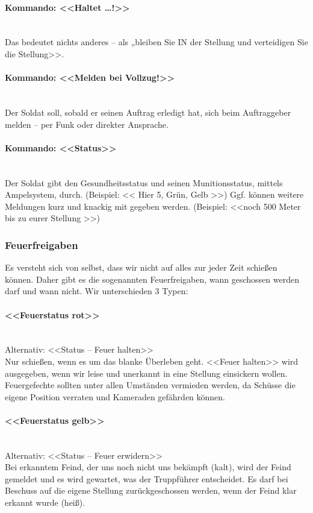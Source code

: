 \paragraph*{Kommando: <<Haltet \dots!>>}\ \\
	Das bedeutet nichts anderes – als „bleiben Sie IN der Stellung und verteidigen Sie die Stellung>>.

\paragraph*{Kommando: <<Melden bei Vollzug!>>}\ \\
	Der Soldat soll, sobald er seinen Auftrag erledigt hat, sich beim Auftraggeber melden – per Funk oder direkter Ansprache.

\paragraph*{Kommando: <<Status>>}\ \\
	Der Soldat gibt den Gesundheitsstatus und seinen Munitionsstatus, mittels Ampelsystem, durch. (Beispiel: << Hier 5, Grün, Gelb >>) Ggf. können weitere Meldungen kurz und knackig mit gegeben werden. (Beispiel: <<noch 500 Meter bis zu eurer Stellung >>)

\subsubsection{Feuerfreigaben}
	Es versteht sich von selbst, dass wir nicht auf alles zur jeder Zeit schießen können. Daher gibt es die sogenannten Feuerfreigaben, wann geschossen werden darf und wann nicht. Wir unterschieden 3 Typen:

\paragraph*{<<Feuerstatus rot>>}\ \\
	Alternativ: <<Status -- Feuer halten>>\hfil\\
	Nur schießen, wenn es um das blanke Überleben geht. <<Feuer halten>> wird ausgegeben, wenn wir leise und unerkannt in eine Stellung einsickern wollen. Feuergefechte sollten unter allen Umständen vermieden werden, da Schüsse die eigene Position verraten und Kameraden gefährden können.

\paragraph*{<<Feuerstatus gelb>>}\ \\
	Alternativ: <<Status -- Feuer erwidern>>\hfil\\
	Bei erkanntem Feind, der uns noch nicht uns bekämpft (kalt), wird der Feind gemeldet und es wird gewartet, was der Truppführer entscheidet. Es darf bei Beschuss auf die eigene Stellung zurückgeschossen werden, wenn der Feind klar erkannt wurde (heiß).


